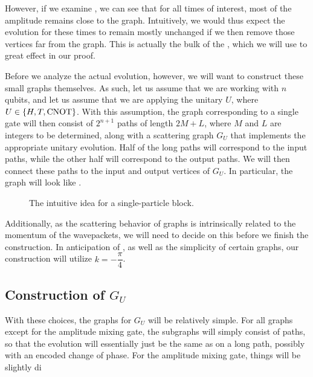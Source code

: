 \documentclass[../thesis-main/thesis-main]{subfiles}
\begin{document}
However, if we examine , we can see that for all times of interest, most of the amplitude remains close to the graph.  Intuitively, we would thus expect the evolution for these times to remain mostly unchanged if we then remove those vertices far from the graph.  This is actually the bulk of the , which we will use to great effect in our proof.

Before we analyze the actual evolution, however, we will want to construct these small graphs themselves.  As such, let us assume that we are working with $n$ qubits, and let us assume that we are applying the unitary $U$, where $U\in \{H, T,\mathrm{CNOT}\}$.  With this assumption, the graph corresponding to  a single gate will then consist of $2^{n+1}$ paths of length $2M+L$, where $M$ and $L$ are integers to be determined, along with a scattering graph $G_U$ that implements the appropriate unitary evolution.  Half of the long paths will correspond to the input paths, while the other half will correspond to the output paths.  We will then connect these paths to the input and output vertices of $G_U$.   In particular, the graph will look like .  


\begin{figure}
  \centering
  
  \caption{The intuitive idea for a single-particle block.}
  \label{fig:SP_block}
\end{figure}

Additionally, as the scattering behavior of graphs is intrinsically related to the momentum of the wavepackets, we will need to decide on this before we finish the construction.  In anticipation of , as well as the simplicity of certain graphs, our construction will utilize $k = -\dfrac{\pi}{4}$.

\subsection{Construction of $G_U$}

With these choices, the graphs for $G_U$ will be relatively simple.  For all graphs except for the amplitude mixing gate, the subgraphs will simply consist of paths, so that the evolution will essentially just be the same as on a long path, possibly with an encoded change of phase.  For the amplitude mixing gate, things will be slightly di
\end{document}

